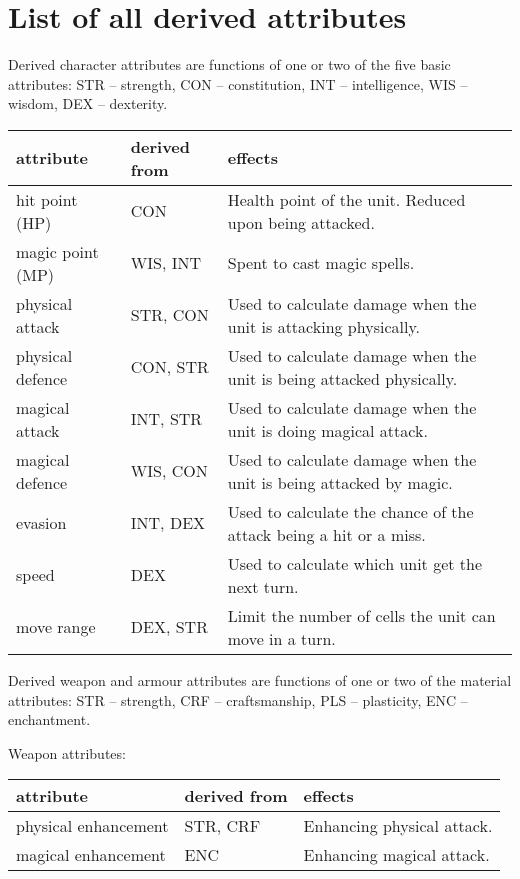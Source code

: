 \chapter{List of all derived attributes}
\label{app:attributes}

Derived character attributes are functions of one or two of the five basic attributes: STR -- strength, CON -- constitution, INT -- intelligence, WIS -- wisdom, DEX -- dexterity. 

\begin{tabu}{X[l2] X[l2] X[l4] }
	\toprule
	attribute & derived from & effects \\ 
	\midrule
	hit point (HP) & CON& Health point of the unit. Reduced upon being attacked.\\
	\addlinespace[0.2cm]
	magic point (MP) & WIS, INT& Spent to cast magic spells.\\
	\addlinespace[0.2cm]
	physical attack & STR, CON& Used to calculate damage when the unit is attacking physically.\\
	\addlinespace[0.2cm]
	physical defence & CON, STR& Used to calculate damage when the unit is being attacked physically.\\
	\addlinespace[0.2cm]
	magical attack & INT, STR& Used to calculate damage when the unit is doing magical attack.\\
	\addlinespace[0.2cm]
	magical defence & WIS, CON& Used to calculate damage when the unit is being attacked by magic.\\
	\addlinespace[0.2cm]
	evasion & INT, DEX& Used to calculate the chance of the attack being a hit or a miss.\\
	\addlinespace[0.2cm]
	speed & DEX& Used to calculate which unit get the next turn.\\
	move range & DEX, STR& Limit the number of cells the unit can move in a turn.\\
	\bottomrule
\end{tabu}

Derived weapon and armour attributes are functions of one or two of the material attributes: STR -- strength, CRF -- craftsmanship, PLS -- plasticity, ENC -- enchantment.

\bigskip
Weapon attributes:

\begin{tabu}{X[l2] X[l2] X[l4] }
	\toprule
	attribute & derived from & effects \\ 
	\midrule
	physical enhancement & STR, CRF & Enhancing physical attack.\\
	\addlinespace[0.2cm]
	magical enhancement & ENC & Enhancing magical attack.\\
	\bottomrule
\end{tabu}

